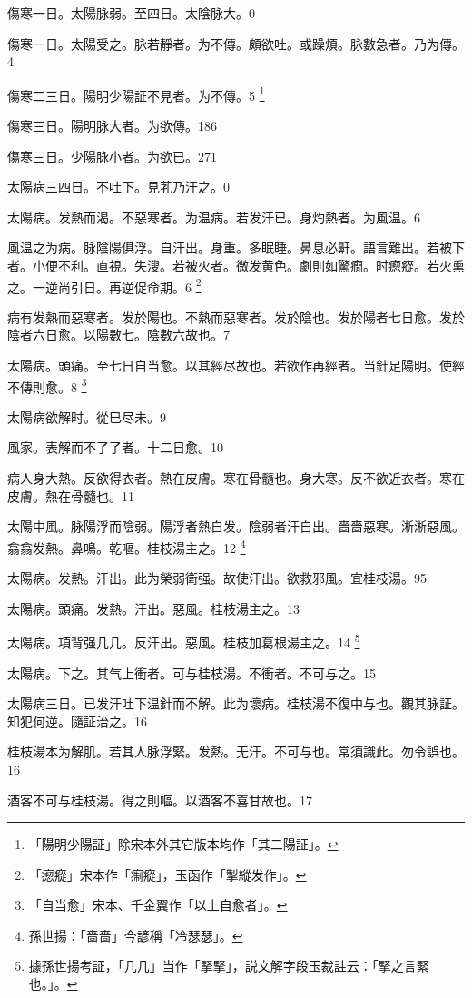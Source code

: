 \documentclass[b5paper,twoside,zihao=-4,UTF8]{ctexbook}
\begin{document}
傷寒一日。太陽脉弱。至四日。太陰脉大。0

傷寒一日。太陽受之。脉若靜者。为不傳。頗欲吐。或躁煩。脉數急者。乃为傳。4

傷寒{二三日}。陽明少陽証不見者。为不傳。5
	\footnote{「陽明少陽証」除宋本外其它版本均作「其二陽証」。}

傷寒三日。陽明脉大{者。为欲傳}。186

傷寒三日。少陽脉小者。为欲已。271

太陽病三四日。不吐下。見芤乃汗之。0

太陽病。发熱而渴。不惡寒者。为温病。若发汗已。身灼熱者。为風温。6

風温{之}为病。脉陰陽俱浮。自汗出。身重。多眠睡。鼻息必鼾。語言難出。若被下者。小便不利。直視。失溲。若被火者。微发黄{色}。劇則如驚癇。时瘛瘲。若火熏之。一逆尚引日。再逆促命期。6
	\footnote{「瘛瘲」宋本作「痸瘲」，玉函作「掣縱发作」。}

病有发熱而惡寒者。发於陽也。不熱而惡寒者。发於陰也。发於陽者七日愈。发於陰者六日愈。以陽數七。陰數六故也。7

太陽病。頭痛。至七日自当愈。以其經尽故也。若欲作再經者。当針足陽明。使經不傳則愈。8
	\footnote{「自当愈」宋本、千金翼作「以上自愈者」。}

太陽病欲解时。從巳尽未。9

風家。表解而不了了者。十二日愈。10

病人身大熱。反欲得衣者。熱在皮膚。寒在骨髓也。身大寒。反不欲近衣者。寒在皮膚。熱在骨髓也。11

太陽中風。{脉}陽浮而陰弱。陽浮者熱自发。陰弱者汗自出。嗇嗇惡寒。淅淅惡風。翕翕发熱。鼻鳴。乾嘔。桂枝湯主之。12
	\footnote{孫世揚：「嗇嗇」今諺稱「冷瑟瑟」。}

太陽病。发熱。汗出。此为榮弱衛强。故使汗出。欲救邪風。宜桂枝湯。95

太陽病。頭痛。发熱。汗出。惡風。桂枝湯主之。13

太陽病。項背强几几。反汗出。惡風。桂枝{加葛根}湯主之。14
	\footnote{據孫世揚考証，「几几」当作「掔掔」，説文解字段玉裁註云：「掔之言緊也。」。}

太陽病。下之。其气上衝者。可与桂枝湯。不衝者。不可与之。15

太陽病三日。已发汗吐下温針而不解。此为壞病。桂枝湯不復中与也。觀其脉証。知犯何逆。隨証治之。16

桂枝湯本为解肌。若其人脉浮緊。发熱。无汗。不可与也。常須識此。勿令誤也。16

酒客不可与桂枝湯。得之則嘔。以酒客不喜甘故也。17
\end{document}
